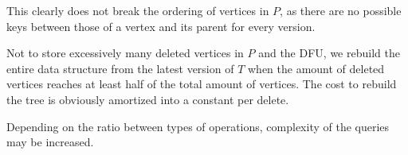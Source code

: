This clearly does not break the ordering of vertices in $P$, as there are no possible keys between those of a vertex and its parent for every version. 
 
Not to store excessively many deleted vertices in $P$ and the DFU, we rebuild the entire data structure from the latest version of $T$ when the amount of deleted vertices reaches at least half of the total amount of vertices. The cost to rebuild the tree is obviously amortized into a constant per delete.
 
Depending on the ratio between types of operations, complexity of the queries may be increased. %